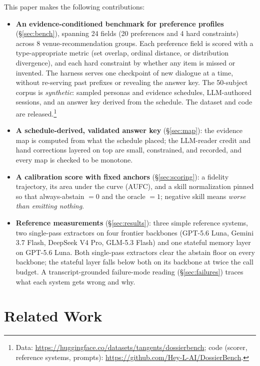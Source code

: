 \documentclass{article}
\begin{document}
This paper makes the following contributions:
\begin{itemize}[leftmargin=*]
  \item \textbf{An evidence-conditioned benchmark for preference profiles} (\S\ref{sec:bench}),
  spanning 24 fields (20 preferences and 4 hard constraints) across 8 venue-recommendation groups. Each preference field is scored
  with a type-appropriate metric (set overlap, ordinal distance, or distribution
  divergence), and each hard constraint by whether any item is missed or invented. The harness serves one checkpoint of new dialogue at a time, without re-serving past
  prefixes or revealing the answer key. The 50-subject corpus is \emph{synthetic}: sampled personas
  and evidence schedules, LLM-authored sessions, and an answer key derived from the schedule. The
  dataset and code are released.\footnote{Data: \url{https://huggingface.co/datasets/tangents/dossierbench}; code (scorer, reference systems, prompts): \url{https://github.com/Hey-L-AI/DossierBench}.}
  \item \textbf{A schedule-derived, validated answer key} (\S\ref{sec:map}): the evidence map is
  computed from what the schedule placed; the LLM-reader credit and hand corrections layered on top
  are small, constrained, and recorded, and every map is checked to be monotone.
  \item \textbf{A calibration score with fixed anchors} (\S\ref{sec:scoring}): a fidelity
  trajectory, its area under the curve (AUFC), and a skill normalization pinned so that
  always-abstain $=0$ and the oracle $=1$; negative skill means \emph{worse than emitting nothing}.
  \item \textbf{Reference measurements} (\S\ref{sec:results}): three simple reference systems, two
  single-pass extractors on four frontier backbones (GPT-5.6 Luna, Gemini 3.7 Flash, DeepSeek V4 Pro,
  GLM-5.3 Flash) and one stateful memory layer on GPT-5.6 Luna. Both single-pass extractors clear the
  abstain floor on every backbone; the stateful layer falls below both on its backbone at twice the
  call budget.
  A transcript-grounded failure-mode reading (\S\ref{sec:failures}) traces what each system
  gets wrong and why.
\end{itemize}

\section{Related Work}
\label{sec:related}
\end{document}
